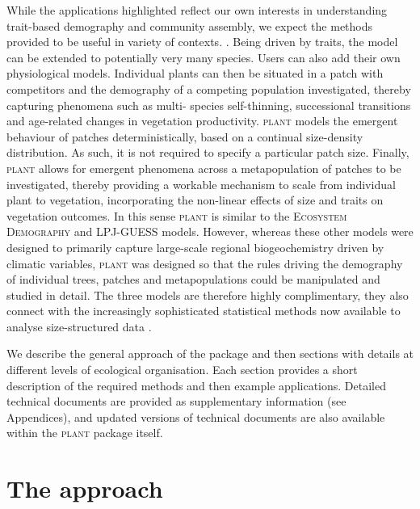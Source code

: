 \documentclass[a4paper,11pt]{article}
\newcommand{\plant}{\textsc{plant}}
\begin{document}
While the applications highlighted reflect our own interests in understanding
trait-based demography and community assembly, we expect the methods provided
to be useful in variety of contexts. . Being driven by traits,
the model can be extended to potentially very many species. Users can also 
add their own physiological models. Individual plants
can then be  situated in a patch with competitors and the demography of a
competing population  investigated, thereby capturing phenomena such as multi-
species self-thinning,  successional transitions and age-related changes in
vegetation productivity. {\plant}  models the emergent behaviour of
patches deterministically, based on a continual  size-density distribution. As
such, it is not required to specify a particular patch size.  Finally,
{\plant} allows for emergent phenomena across a metapopulation of patches
to  be investigated, thereby providing a workable mechanism to scale from
individual plant to  vegetation, incorporating the non-linear effects of size
and traits on vegetation outcomes. 
In  this sense {\plant} is similar to
the \textsc{Ecosystem Demography} \citep{Moorcroft-2001}  and \textsc{LPJ-GUESS}
\citep{Smith-2014} models. However, whereas these other models were designed
to primarily capture large-scale regional biogeochemistry driven by climatic
variables,  {\plant} was designed so that the rules driving the
demography of individual trees, patches and metapopulations could be
manipulated and studied in detail. The three models are therefore highly 
complimentary, they also connect with the increasingly sophisticated statistical 
methods now available to analyse size-structured data
\citep[e.g.][]{Metcalf-2013}.

We describe the general approach of the package and then sections with
details at different levels of ecological organisation. Each section
provides a short description of the required methods and then example 
applications. Detailed technical
documents are provided as supplementary information (see Appendices),
and updated versions of technical documents are also available within
the {\plant} package itself.

\section{The approach}

\end{document}
